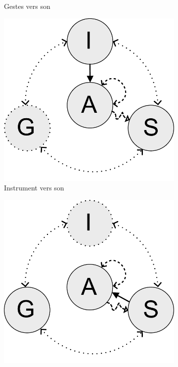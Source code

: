 \begin{figure}[!htbp]
{\begin{subfigure}[b]{.33\textwidth}
			\caption{Gestes vers son}
		\end{subfigure}%
		\hspace{.02\linewidth}
		\begin{subfigure}[b]{.33\textwidth}
			\centering
			\includegraphics[width=0.9\linewidth]{gfx/03_gesture/gesture-inference-e.pdf}
			\caption{Instrument vers son}
		\end{subfigure}%
		\hspace{.02\linewidth}
		\begin{subfigure}[b]{.33\textwidth}
			\centering
			\includegraphics[width=0.9\linewidth]{gfx/03_gesture/gesture-inference-f.pdf}

\end{subfigure}}
\end{figure}
